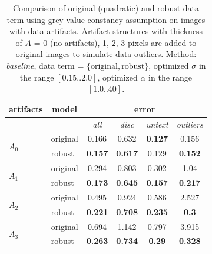 \begin{table}[ht] \scriptsize
  \centering
  \caption{Comparison of original (quadratic) and robust data term using grey value constancy assumption on images with data artifacts. Artifact structures with thickness of  $A$ = 0 (no artifacts), 1, 2, 3 pixels are added to original images to simulate data outliers. Method: \textit{baseline}, data term = $\lbrace \text{original}, \text{robust} \rbrace$, optimized $\sigma$ in the range $[0.15 .. 2.0]$,  optimized $\alpha$ in the range $[1.0 .. 40]$. }
    \begin{tabular}{rrcrrr}
    \toprule
    \multicolumn{1}{c}{artifacts} & \multicolumn{1}{c}{model} & \multicolumn{4}{c}{error} \\
    \midrule
          &       & \textit{all} & \multicolumn{1}{c}{\textit{disc}} & \multicolumn{1}{c}{\textit{untext}} & \multicolumn{1}{c}{\textit{outliers}} \\        
          \midrule
          \midrule       
    \multicolumn{1}{l}{\multirow{2}[0]{*}{$A_0$}} & \multicolumn{1}{l}{original} & 0.166 & \multicolumn{1}{c}{0.632} & \multicolumn{1}{c}{\textbf{0.127}} & \multicolumn{1}{c}{0.156} \\
          & \multicolumn{1}{l}{robust} & \textbf{0.157} & \multicolumn{1}{c}{\textbf{0.617}} & \multicolumn{1}{c}{0.129} & \multicolumn{1}{c}{\textbf{0.152}} \\
          \midrule
          
    \multicolumn{1}{l}{\multirow{2}[0]{*}{$A_1$}} & \multicolumn{1}{l}{original} & 0.294 & \multicolumn{1}{c}{0.803} & \multicolumn{1}{c}{0.302} & \multicolumn{1}{c}{1.04} \\
          & \multicolumn{1}{l}{robust} & \textbf{0.173} & \multicolumn{1}{c}{\textbf{0.645}} & \multicolumn{1}{c}{\textbf{0.157}} & \multicolumn{1}{c}{\textbf{0.217}} \\
          
          \midrule
    \multicolumn{1}{l}{\multirow{2}[0]{*}{$A_2$}} & \multicolumn{1}{l}{original} & 0.495 & \multicolumn{1}{c}{0.924} & \multicolumn{1}{c}{0.586} & \multicolumn{1}{c}{2.527} \\
          & \multicolumn{1}{l}{robust} & \textbf{0.221} & \multicolumn{1}{c}{\textbf{0.708}} & \multicolumn{1}{c}{\textbf{0.235}} & \multicolumn{1}{c}{\textbf{0.3}} \\
          
          \midrule
    \multicolumn{1}{l}{\multirow{2}[0]{*}{$A_3$}} & \multicolumn{1}{l}{original} & 0.694 & \multicolumn{1}{c}{1.142} & \multicolumn{1}{c}{0.797} & \multicolumn{1}{c}{3.915} \\
          & \multicolumn{1}{l}{robust} & \textbf{0.263} & \multicolumn{1}{c}{\textbf{0.734}} & \multicolumn{1}{c}{\textbf{0.29}} & \multicolumn{1}{c}{\textbf{0.328}} \\
    \bottomrule
    \end{tabular}%
  \label{tab:exp_robust_artifacts}%
\end{table}%

